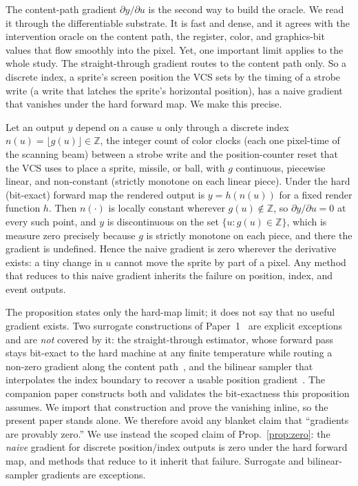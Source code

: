 The content-path gradient $\partial y / \partial u$ is the second way to build the oracle. We
read it through the differentiable substrate. It is fast and dense, and it agrees with the
intervention oracle on the content path, the register, color, and graphics-bit values that
flow smoothly into the pixel. Yet, one important limit applies to the whole study.
The straight-through gradient routes to the content path only. So a discrete index, a
sprite's screen position the VCS sets by the timing of a strobe write (a write that latches the sprite's horizontal position), has a naive gradient
that vanishes under the hard forward map. We make this precise.

\begin{proposition}\label{prop:zero}
Let an output $y$ depend on a cause $u$ only through a discrete index
$n(u)=\lfloor g(u)\rfloor\in\mathbb{Z}$, the integer count of color clocks (each one pixel-time of the scanning beam) between a strobe
write and the position-counter reset that the VCS uses to place a sprite, missile, or ball,
with $g$ continuous, piecewise linear, and non-constant (strictly monotone on each linear
piece). Under the hard (bit-exact) forward map the rendered output is $y=h(n(u))$ for a fixed
render function $h$. Then $n(\cdot)$ is locally constant wherever $g(u)\notin\mathbb{Z}$, so
$\partial y/\partial u=0$ at every such point, and $y$ is discontinuous on the set
$\{u:g(u)\in\mathbb{Z}\}$, which is measure zero precisely because $g$ is strictly monotone on
each piece, and there the gradient is undefined. Hence the naive gradient is zero wherever the
derivative exists: a tiny change in $u$ cannot move the sprite by part of a pixel. Any method
that reduces to this naive gradient inherits the failure on position, index, and event outputs.
\end{proposition}

The proposition states only the hard-map limit; it does not say that no useful gradient
exists. Two surrogate constructions of Paper~1~\cite{maier2025vcs} are explicit exceptions and
are \emph{not} covered by it: the straight-through estimator, whose forward pass stays
bit-exact to the hard machine at any finite temperature while routing a non-zero
gradient along the content path~\cite{bengio2013estimating,jang2017gumbel}, and the bilinear
sampler that interpolates the index boundary to recover a usable position
gradient~\cite{jaderberg2015spatial}. The companion paper constructs both and validates the
bit-exactness this proposition assumes. We import that construction and prove the vanishing
inline, so the present paper stands alone. We therefore avoid any blanket claim that
``gradients are provably zero.'' We use instead the scoped claim of Prop.~\ref{prop:zero}: the
\emph{naive} gradient for discrete position/index outputs is zero under the hard forward map,
and methods that reduce to it inherit that failure. Surrogate and bilinear-sampler gradients
are exceptions.

